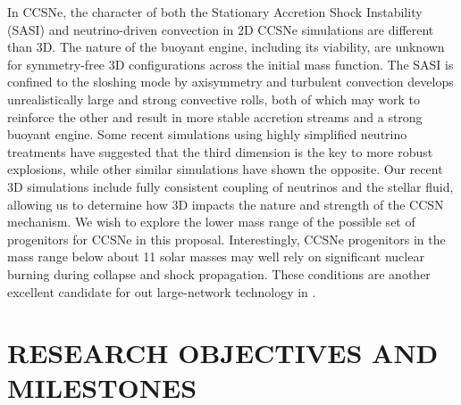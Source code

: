 \documentclass[11pt,letterpaper,english]{article}
\begin{document}
In CCSNe, the character of both the Stationary Accretion Shock Instability (SASI) and neutrino-driven convection in 2D CCSNe simulations are different than 3D. The nature of the buoyant engine, including its viability, are unknown for symmetry-free 3D configurations across the initial mass function. The SASI is confined to the sloshing mode by axisymmetry and turbulent convection develops unrealistically large and strong convective rolls, both of which may work to reinforce the other and result in more stable accretion streams and a strong buoyant engine. 
Some recent simulations using highly simplified neutrino treatments have suggested that the third dimension is the key to more robust explosions, while other similar simulations have shown the opposite. Our recent 3D simulations \citep{lentzetal2015}  include  fully consistent coupling of neutrinos and the stellar fluid, allowing us to determine how 3D impacts the nature and strength of the CCSN mechanism. We wish to explore the lower mass range of the possible set of progenitors for CCSNe in this proposal. Interestingly, CCSNe progenitors in the mass range below about 11 solar masses may well rely on significant nuclear burning during collapse and shock propagation. These conditions are another excellent candidate for out large-network technology in \chimera.



\section{RESEARCH OBJECTIVES AND MILESTONES }  










\end{document}
